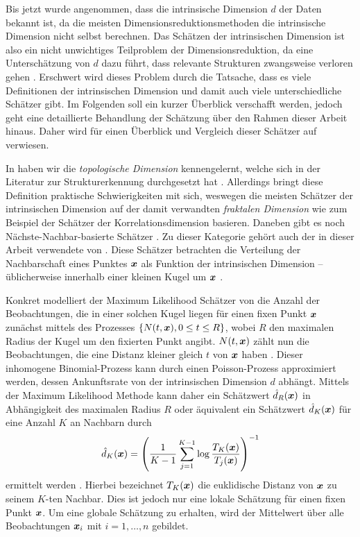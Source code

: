 Bis jetzt wurde angenommen, dass die intrinsische Dimension $d$ der Daten bekannt ist, da die
meisten Dimensionsreduktionsmethoden die intrinsische Dimension nicht selbst berechnen. Das
Schätzen der intrinsischen Dimension ist also ein nicht unwichtiges Teilproblem der
Dimensionsreduktion, da eine Unterschätzung von $d$ dazu führt, dass relevante Strukturen
zwangsweise verloren gehen \parencite[1]{Levina.2004}. Erschwert wird dieses Problem durch die Tatsache, dass es viele
Definitionen der intrinsischen Dimension und damit auch viele unterschiedliche Schätzer gibt. Im
Folgenden soll ein kurzer Überblick verschafft werden, jedoch geht eine detaillierte Behandlung der
Schätzung über den Rahmen dieser Arbeit hinaus. Daher wird für einen Überblick und Vergleich dieser
Schätzer auf \textcites{Campadelli.2015}{Bac.2021}{Verveer.1995} verwiesen.

In  haben wir die \textit{topologische
	Dimension} kennengelernt, welche sich in der Literatur zur Strukturerkennung durchgesetzt hat \parencite[1]{Campadelli.2015}. Allerdings bringt diese Definition praktische Schwierigkeiten mit sich,
weswegen die meisten Schätzer der intrinsischen Dimension auf der damit verwandten
\textit{fraktalen Dimension} wie zum Beispiel der Schätzer der Korrelationsdimension \parencite{Camastra.2002} basieren. Daneben gibt es noch Nächste-Nachbar-basierte Schätzer \parencite[1]{Campadelli.2015}. Zu dieser Kategorie gehört auch der in dieser Arbeit verwendete
 von \textcite{Levina.2004}. Diese Schätzer betrachten die
Verteilung der Nachbarschaft eines Punktes $\bm{x}$ als Funktion der intrinsischen Dimension --
üblicherweise innerhalb einer kleinen Kugel um $\bm{x}$
\parencite[8]{Campadelli.2015}.

Konkret modelliert der Maximum Likelihood Schätzer von \textcite{Levina.2004} die Anzahl der
Beobachtungen, die in einer solchen Kugel liegen für einen fixen Punkt $\bm{x}$ zunächst mittels
des Prozesses $\{ N(t, \bm{x}), 0 \leq t \leq R \}$, wobei $R$ den maximalen Radius der Kugel um
den fixierten Punkt angibt. $N(t, \bm{x})$ zählt nun die Beobachtungen, die eine Distanz kleiner
gleich $t$ von $\bm{x}$ haben \parencite[3]{Levina.2004}. Dieser inhomogene Binomial-Prozess kann durch einen Poisson-Prozess
approximiert werden, dessen Ankunftsrate von der intrinsischen Dimension $d$ abhängt. Mittels der
Maximum Likelihood Methode kann daher ein Schätzwert $\hat{d}_R(\bm{x})$ in Abhängigkeit
des maximalen Radius $R$ oder äquivalent ein Schätzwert $\hat{d}_K(\bm{x})$ für eine Anzahl
$K$ an Nachbarn durch
\begin{equation}
	\hat{d}_K(\bm{x}) = \left( \frac{1}{K - 1} \sum_{j=1}^{K - 1} \log \frac{T_K(\bm{x})}{T_j(\bm{x})} \right)^{-1}
\end{equation}
ermittelt werden \parencite[3 -- 4]{Levina.2004}. Hierbei bezeichnet $T_{K}(\bm{x})$ die euklidische Distanz von
$\bm{x}$ zu seinem $K$-ten Nachbar. Dies ist jedoch nur eine lokale Schätzung für einen fixen
Punkt $\bm{x}$. Um eine globale Schätzung zu erhalten, wird der Mittelwert über alle
Beobachtungen $\bm{x}_i$ mit $i = 1, \ldots, n$ gebildet.
